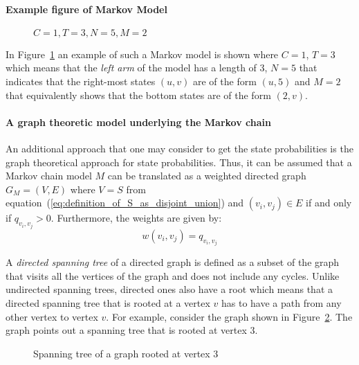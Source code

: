 \paragraph{Example figure of Markov Model}

\begin{figure}[H]
    \centering
    \scalebox{0.7}{
        
        }
    \caption{\(C=1, T=3, N=5, M=2\)}
    \label{fig:Markov_1352_example_for_closed_form}
\end{figure}

In Figure~\ref{fig:Markov_1352_example_for_closed_form} an example of such a 
Markov model is shown where \(C=1\), \(T=3\) which means that the \textit{left 
arm} of the model has a length of \(3\), \(N=5\) that indicates that the
right-most states \((u,v)\) are of the form \((u,5)\) and \(M=2\) that
equivalently shows that the bottom states are of the form \((2,v)\).

\paragraph{A graph theoretic model underlying the Markov chain}

An additional approach that one may consider to get the state probabilities is 
the graph theoretical approach for state probabilities.
Thus, it can be assumed that a Markov chain model \(M\) can be translated as a 
weighted directed graph \(G_M = (V, E)\) where \(V=S\) from
equation~(\ref{eq:definition_of_S_as_disjoint_union}) and \((v_i, v_j)\in E\) if
and only if \(q_{v_i, v_j}>0\). 
Furthermore, the weights are given by:
\[
    w(v_i, v_j) = q_{v_i, v_j}
\]

A \textit{directed spanning tree} of a directed graph is defined as a subset of 
the graph that visits all the vertices of the graph and does not include any
cycles. 
Unlike undirected spanning trees, directed ones also have a root which means 
that a directed spanning tree that is rooted at a vertex \(v\) has to have a 
path from any other vertex to vertex \(v\). 
For example, consider the graph shown in Figure~\ref{fig:example_spanning_tree}.
The graph points out a spanning tree that is rooted at vertex 3.


\begin{figure}[H]
    \centering
    \caption{Spanning tree of a graph rooted at vertex 3}
    \label{fig:example_spanning_tree}
\end{figure}

